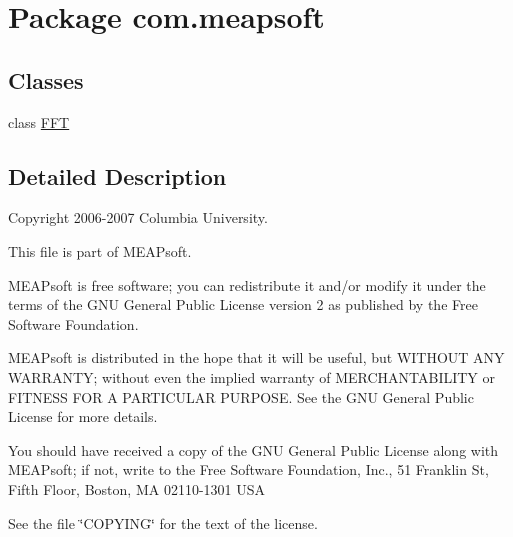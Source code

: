 \hypertarget{namespacecom_1_1meapsoft}{}\section{Package com.\+meapsoft}
\label{namespacecom_1_1meapsoft}
\subsection*{Classes}
\begin{DoxyCompactItemize}
\item 
class \hyperlink{classcom_1_1meapsoft_1_1_f_f_t}{F\+F\+T}
\end{DoxyCompactItemize}


\subsection{Detailed Description}
Copyright 2006-\/2007 Columbia University.

This file is part of M\+E\+A\+Psoft.

M\+E\+A\+Psoft is free software; you can redistribute it and/or modify it under the terms of the G\+N\+U General Public License version 2 as published by the Free Software Foundation.

M\+E\+A\+Psoft is distributed in the hope that it will be useful, but W\+I\+T\+H\+O\+U\+T A\+N\+Y W\+A\+R\+R\+A\+N\+T\+Y; without even the implied warranty of M\+E\+R\+C\+H\+A\+N\+T\+A\+B\+I\+L\+I\+T\+Y or F\+I\+T\+N\+E\+S\+S F\+O\+R A P\+A\+R\+T\+I\+C\+U\+L\+A\+R P\+U\+R\+P\+O\+S\+E. See the G\+N\+U General Public License for more details.

You should have received a copy of the G\+N\+U General Public License along with M\+E\+A\+Psoft; if not, write to the Free Software Foundation, Inc., 51 Franklin St, Fifth Floor, Boston, M\+A 02110-\/1301 U\+S\+A

See the file \char`\"{}\+C\+O\+P\+Y\+I\+N\+G\char`\"{} for the text of the license. 